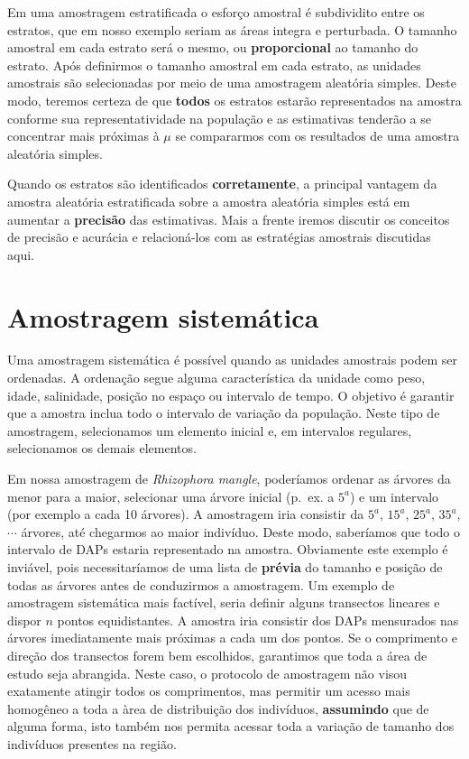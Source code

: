 \documentclass[
]{book}
\begin{document}
Em uma amostragem estratificada o esforço amostral é subdividito entre os estratos, que em nosso exemplo seriam as áreas integra e perturbada. O tamanho amostral em cada estrato será o mesmo, ou \textbf{proporcional} ao tamanho do estrato. Após definirmos o tamanho amostral em cada estrato, as unidades amostrais são selecionadas por meio de uma amostragem aleatória simples. Deste modo, teremos certeza de que \textbf{todos} os estratos estarão representados na amostra conforme sua representatividade na população e as estimativas tenderão a se concentrar mais próximas à \(\mu\) se compararmos com os resultados de uma amostra aleatória simples.

Quando os estratos são identificados \textbf{corretamente}, a principal vantagem da amostra aleatória estratificada sobre a amostra aleatória simples está em aumentar a \textbf{precisão} das estimativas. Mais a frente iremos discutir os conceitos de precisão e acurácia e relacioná-los com as estratégias amostrais discutidas aqui.

\hypertarget{amostragem-sistemuxe1tica}{%
\section{Amostragem sistemática}\label{amostragem-sistemuxe1tica}}

Uma amostragem sistemática é possível quando as unidades amostrais podem ser ordenadas. A ordenação segue alguma característica da unidade como peso, idade, salinidade, posição no espaço ou intervalo de tempo. O objetivo é garantir que a amostra inclua todo o intervalo de variação da população. Neste tipo de amostragem, selecionamos um elemento inicial e, em intervalos regulares, selecionamos os demais elementos.

Em nossa amostragem de \emph{Rhizophora mangle}, poderíamos ordenar as árvores da menor para a maior, selecionar uma árvore inicial (p.~ex. a \(5^a\)) e um intervalo (por exemplo a cada 10 árvores). A amostragem iria consistir da \(5^a\), \(15^a\), \(25^a\), \(35^a\), \(\cdots\) árvores, até chegarmos ao maior indivíduo. Deste modo, saberíamos que todo o intervalo de DAPs estaria representado na amostra. Obviamente este exemplo é inviável, pois necessitaríamos de uma lista de \textbf{prévia} do tamanho e posição de todas as árvores antes de conduzirmos a amostragem. Um exemplo de amostragem sistemática mais factível, seria definir alguns transectos lineares e dispor \(n\) pontos equidistantes. A amostra iria consistir dos DAPs mensurados nas árvores imediatamente mais próximas a cada um dos pontos. Se o comprimento e direção dos transectos forem bem escolhidos, garantimos que toda a área de estudo seja abrangida. Neste caso, o protocolo de amostragem não visou exatamente atingir todos os comprimentos, mas permitir um acesso mais homogêneo a toda a àrea de distribuição dos indivíduos, \textbf{assumindo} que de alguma forma, isto também nos permita acessar toda a variação de tamanho dos indivíduos presentes na região.
\end{document}
